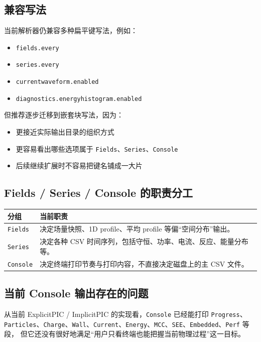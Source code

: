 \documentclass[11pt,a4paper]{ctexart}
\newcommand{\code}[1]{\texttt{#1}}
\begin{document}
\subsection{兼容写法}

当前解析器仍兼容多种扁平键写法，例如：

\begin{itemize}
  \item \code{fields.every}
  \item \code{series.every}
  \item \code{currentwaveform.enabled}
  \item \code{diagnostics.energyhistogram.enabled}
\end{itemize}

但推荐逐步迁移到嵌套块写法，因为：

\begin{itemize}
  \item 更接近实际输出目录的组织方式
  \item 更容易看出哪些选项属于 \code{Fields}、\code{Series}、\code{Console}
  \item 后续继续扩展时不容易把键名铺成一大片
\end{itemize}

\subsection{Fields / Series / Console 的职责分工}

\begin{longtable}{p{}p{}}
\toprule
分组 & 当前职责 \\
\midrule
\endhead
\code{Fields} & 决定场量快照、1D profile、平均 profile 等偏``空间分布''输出。 \\
\code{Series} & 决定各种 CSV 时间序列，包括守恒、功率、电流、反应、能量分布等。 \\
\code{Console} & 决定终端打印节奏与打印内容，不直接决定磁盘上的主 CSV 文件。 \\
\bottomrule
\end{longtable}

\subsection{当前 Console 输出存在的问题}

从当前 ExplicitPIC / ImplicitPIC 的实现看，\code{Console} 已经能打印
\code{Progress}、\code{Particles}、\code{Charge}、\code{Wall}、\code{Current}、\code{Energy}、\code{MCC}、\code{SEE}、\code{Embedded}、\code{Perf} 等段，
但它还没有很好地满足``用户只看终端也能把握当前物理过程''这一目标。
\end{document}
